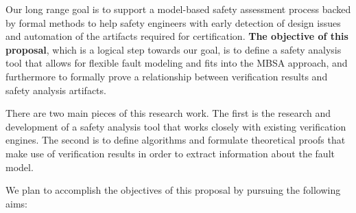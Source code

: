 Our long range goal is to support a model-based safety assessment process backed by formal methods to help safety engineers with early detection of design issues and automation of the artifacts required for certification. \textbf{The objective of this proposal}, which is a logical step towards our goal, is to define a safety analysis tool that allows for flexible fault modeling and fits into the MBSA approach, and furthermore to formally prove a relationship between verification results and safety analysis artifacts.


There are two main pieces of this research work. The first is the research and development of a safety analysis tool that works closely with existing verification engines. The second is to define algorithms and formulate theoretical proofs that make use of verification results in order to extract information about the fault model.  

We plan to accomplish the objectives of this proposal by pursuing the following aims:

